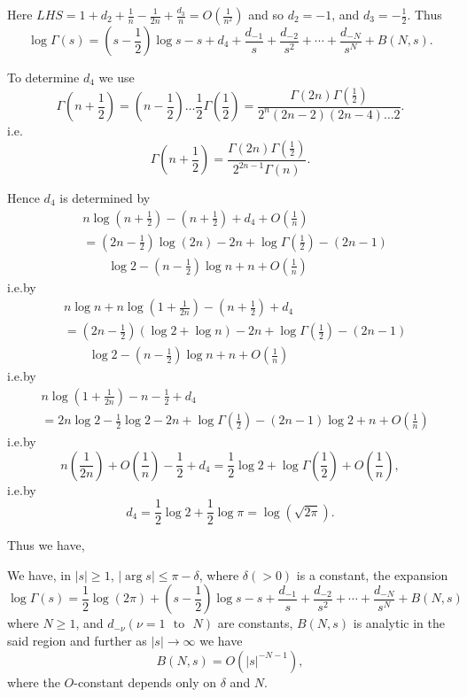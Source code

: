 Here
$LHS=1+d_{2}+\frac{1}{n}-\frac{1}{2n}+\frac{d_{3}}{n}=O(\frac{1}{n^{2}})$
and so $d_{2}=-1$, and $d_{3}=-\frac{1}{2}$. Thus
\begin{equation*}
\log \Gamma(s)=\left(s-\frac{1}{2}\right)\log
s-s+d_{4}+\frac{d_{-1}}{s}+\frac{d_{-2}}{s^{2}}+\cdots+\frac{d_{-N}}{s^{N}}+B(N,s).\tag{7.4.7}\label{c7:eq7.4.7} 
\end{equation*}

To determine $d_{4}$ we use
$$
\Gamma\left(n+\frac{1}{2}\right)=\left(n-\frac{1}{2}\right)\ldots
\frac{1}{2}\Gamma\left(\frac{1}{2}\right)=\frac{\Gamma(2n)\Gamma(\frac{1}{2})}{2^{n}(2n-2)(2n-4)\ldots
  2}.
$$
i.e.
$$
\Gamma\left(n+\frac{1}{2}\right)=\frac{\Gamma(2n)\Gamma(\frac{1}{2})}{2^{2n-1}\Gamma(n)}. 
$$

Hence $d_{4}$ is determined by 
\begin{align*}
& n\log
  \left(n+\frac{1}{2}\right)-\left(n+\frac{1}{2}\right)+d_{4}+O\left(\frac{1}{n}\right)\\
&= \left(2n-\frac{1}{2}\right)\log(2n)-2n+\log
  \Gamma\left(\frac{1}{2}\right)-(2n-1)\\
&\qquad\log  2 -\left(n-\frac{1}{2}\right)\log n+n+O\left(\frac{1}{n}\right)
\end{align*}\pageoriginale
i.e.\@ by
\begin{align*}
& n\log n+n\log
  \left(1+\frac{1}{2n}\right)-\left(n+\frac{1}{2}\right)+d_{4}\\
&=\left(2n-\frac{1}{2}\right)(\log 2+\log n)-2n+\log
  \Gamma\left(\frac{1}{2}\right)
 -(2n-1)\\
&\qquad\log 2-\left(n-\frac{1}{2}\right)\log n+n+O\left(\frac{1}{n}\right)
\end{align*}
i.e.\@ by
\begin{align*}
& n\log \left(1+\frac{1}{2n}\right)-n-\frac{1}{2}+d_{4}\\
& =2n\log 2-\frac{1}{2}\log 2-2n+\log
  \Gamma\left(\frac{1}{2}\right)-(2n-1)\log 2+n+O\left(\frac{1}{n}\right)
\end{align*}
i.e.\@ by
$$
n\left(\frac{1}{2n}\right)+O\left(\frac{1}{n}\right)-\frac{1}{2}+d_{4}=\frac{1}{2}\log
2+\log \Gamma\left(\frac{1}{2}\right)+O\left(\frac{1}{n}\right),
$$
i.e.\@ by
$$
d_{4}=\frac{1}{2}\log 2+\frac{1}{2}\log \pi=\log (\sqrt{2\pi}).
$$

Thus we have,

\begin{theorem}\label{c7:thm7.4.2}
We have, in $|s|\geq 1$, $|\arg s|\leq \pi-\delta$, where $\delta(>0)$
is a constant, the expansion
\begin{equation*}
\log \Gamma(s)=\frac{1}{2}\log (2\pi)+\left(s-\frac{1}{2}\right)\log
s-s+\frac{d_{-1}}{s}+\frac{d_{-2}}{s^{2}}+\cdots+\frac{d_{-N}}{s^{N}}+B(N,s)\tag{7.4.8}\label{c7:eq7.4.8} 
\end{equation*}
where $N\geq 1$, and $d_{-\nu}(\nu=1\text{~ to~ }N)$ are constants,
$B(N,s)$ is analytic in the said region and further as $|s|\to \infty$
we have
\eject
\begin{equation*}
B(N,s)=O(|s|^{-N-1}),\tag{7.4.9}\label{c7:eq7.4.9}
\end{equation*}
where the $O$-constant depends only on $\delta$ and $N$. 
\end{theorem}

